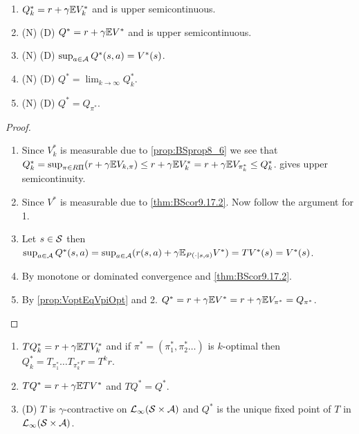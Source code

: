 \begin{prop}
  \leavevmode
  \begin{enumerate}
    \item $Q^*_k = r + \gamma \mathbb{E} V^*_k$ and is upper semicontinuous.
    \item (N) (D) $Q^* = r + \gamma \mathbb{E} V^*$ and is upper semicontinuous.
    \item (N) (D) $\sup_{a \in \mathcal{A}} Q^*(s, a) = V^*(s)$.
    \item (N) (D) $Q^* = \lim_{k\to\infty} Q_k^*$.
    \item (N) (D) $Q^* = Q_{\pi^*}$.
  \end{enumerate}
\end{prop}
\begin{proof}
  \leavevmode
  \begin{enumerate}
    \item Since $V_k^*$ is measurable due to \cref{prop:BSprop8_6}
      we see that
      $Q_k^* = \sup_{\pi \in R\Pi} (r + \gamma \mathbb{E} V_{k,\pi})
      \leq r + \gamma \mathbb{E} V_k^* = r + \gamma \mathbb{E} V_{\pi_k^*}
      \leq Q_k^*$.
       gives upper semicontinuity.
    \item Since $V^*$ is measurable due to \cref{thm:BScor9.17.2}.
      Now follow the argument for 1.
    \item Let $s \in \mathcal{S}$ then $\sup_{a \in \mathcal{A}} Q^*(s, a) = 
      \sup_{a \in \mathcal{A}} (r(s, a) + \gamma \mathbb{E}_{P(\cdot \mid s, a)} V^*)
      = T V^*(s) = V^*(s)$.
    \item By monotone or dominated convergence and \cref{thm:BScor9.17.2}.
    \item By \cref{prop:VoptEqVpiOpt} and 2.
      $Q^* = r + \gamma \mathbb{E} V^* = r + \gamma \mathbb{E} V_{\pi^*} = Q_{\pi^*}$.
      \end{enumerate}
\end{proof}

\begin{prop}
  \leavevmode
  \begin{enumerate}
    \item $TQ^*_k = r + \gamma \mathbb{E} T V^*_k$ and if
      $\pi^* = (\pi^*_1, \pi^*_2 \dots)$
      is $k$-optimal then
      $Q^*_k = T_{\pi^*_1} \dots T_{\pi^*_k} r = T^k r$.
    \item $TQ^* = r + \gamma \mathbb{E} T V^*$ and $TQ^* = Q^*$.
    \item (D) $T$ is $\gamma$-contractive on
      $\mathcal{L}_\infty(\mathcal{S}\times\mathcal{A})$
      and $Q^*$ is the unique fixed point of $T$ in 
      $\mathcal{L}_\infty(\mathcal{S}\times\mathcal{A})$.
  \end{enumerate}
  \label{prop:TQfp}
\end{prop}

